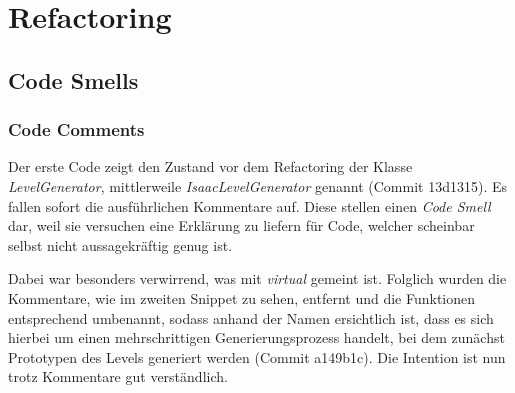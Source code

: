 \chapter{Refactoring}

\section{Code Smells}
\subsection*{Code Comments}
Der erste Code zeigt den Zustand vor dem Refactoring der Klasse 
\textit{LevelGenerator}, mittlerweile \textit{IsaacLevelGenerator}
genannt (Commit 13d1315). Es fallen sofort die ausführlichen Kommentare
auf. Diese stellen einen \textit{Code Smell} dar, weil sie versuchen
eine Erklärung zu liefern für Code, welcher scheinbar selbst nicht
aussagekräftig genug ist.

Dabei war besonders verwirrend, was mit \textit{virtual} gemeint ist.
Folglich wurden die Kommentare, wie im zweiten Snippet zu sehen,
entfernt und die Funktionen entsprechend umbenannt, sodass anhand
der Namen ersichtlich ist, dass es sich hierbei um einen mehrschrittigen
Generierungsprozess handelt, bei dem zunächst Prototypen des Levels
generiert werden (Commit a149b1c). Die Intention ist nun trotz
Kommentare gut verständlich.

